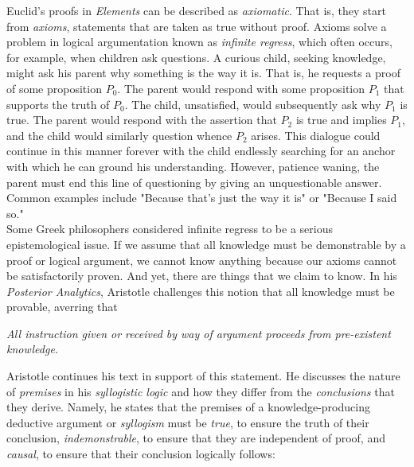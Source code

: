 Euclid's proofs in \textit{Elements} can be described as \textit{axiomatic}. That is, they start from \textit{axioms}, statements that are taken as true without proof. Axioms solve a problem in logical argumentation known as \textit{infinite regress}, which often occurs, for example, when children ask questions. A curious child, seeking knowledge, might ask his parent why something is the way it is. That is, he requests a proof of some proposition $P_0$. The parent would respond with some proposition $P_1$ that supports the truth of $P_0$. The child, unsatisfied, would subsequently ask why $P_1$ is true. The parent would respond with the assertion that $P_2$ is true and implies $P_1$, and the child would similarly question whence $P_2$ arises. This dialogue could continue in this manner forever with the child endlessly searching for an anchor with which he can ground his understanding. However, patience waning, the parent must end this line of questioning by giving an unquestionable answer. Common examples include "Because that's just the way it is" or "Because I said so." \\

Some Greek philosophers considered infinite regress to be a serious epistemological issue. If we assume that all knowledge must be demonstrable by a proof or logical argument, we cannot know anything because our axioms cannot be satisfactorily proven. And yet, there are things that we claim to know. In his \textit{Posterior Analytics}, Aristotle challenges this notion that all knowledge must be provable, averring that \\

\begin{displayquote}
	\textit{All instruction given or received by way of argument proceeds from pre-existent knowledge.}
	\vspace{4mm}
\end{displayquote} 

Aristotle continues his text in support of this statement. He discusses the nature of \textit{premises} in his \textit{syllogistic logic} and how they differ from the \textit{conclusions} that they derive. Namely, he states that the premises of a knowledge-producing deductive argument or \textit{syllogism} must be \textit{true}, to ensure the truth of their conclusion, \textit{indemonstrable}, to ensure that they are independent of proof, and \textit{causal}, to ensure that their conclusion logically follows: \\

